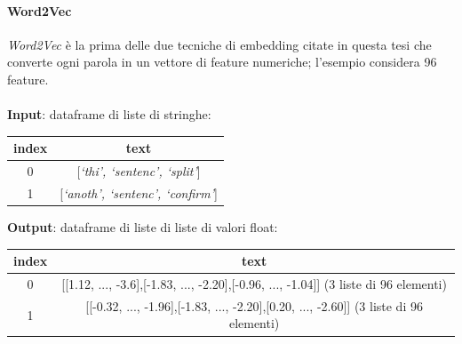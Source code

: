 \documentclass[12pt]{report}
\theoremstyle{definition}
\begin{document}
\paragraph{Word2Vec}
\textit{Word2Vec} è la prima delle due tecniche di embedding citate in questa tesi che converte ogni parola in un vettore di feature numeriche; l'esempio considera 96 feature.
\\
\\
\textbf{Input}: dataframe di liste di stringhe:
\begin{center}
    \begin{tabular}{|c|c|}
    \hline
    \textbf{index} & \textbf{text} \\
    \hline
         0 & [\textit{`thi', `sentenc', `split'}]\\
         1 & [\textit{`anoth', `sentenc', `confirm'}]\\
    \hline
    \end{tabular}
\end{center}
\textbf{Output}: dataframe di liste di liste di valori float:
\begin{center}
    \begin{tabular}{|c|c|}
    \hline
    \textbf{index} & \textbf{text} \\
    \hline
         0 & [[1.12, ..., -3.6],[-1.83, ..., -2.20],[-0.96, ..., -1.04]] (3 liste di 96 elementi) \\
         1 & [[-0.32, ..., -1.96],[-1.83, ..., -2.20],[0.20, ..., -2.60]] (3 liste di 96 elementi)\\
    \hline
    \end{tabular}
\end{center}
\end{document}
